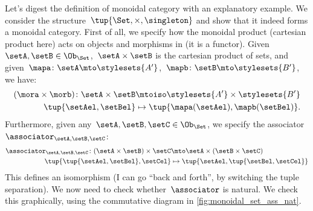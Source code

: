 
\begin{example}
    Let's digest the definition of monoidal category with an explanatory example.
    We consider the structure~$\tup{\Set,\times,\singleton}$ and show that it indeed forms a monoidal category.
    First of all, we specify how the monoidal product (cartesian product here) acts on objects and morphisms in \Set (it is a functor).
    Given~$\setA,\setB\in \Ob_{\Set}$,~$\setA\times \setB$ is the cartesian product of sets, and given~$\mapa\colon \setA\mto \stylesets{A'}$,~$\mapb\colon \setB\mto \stylesets{B'}$, we have:
    \begin{equation*}
        \label{eq:set_mon_prod_2}
        \begin{aligned}
        (\mora \times \morb)
            \colon \setA\times \setB&\mtoiso \stylesets{A'}\times \stylesets{B'}\\
            \tup{\setAel,\setBel}&\mapsto \tup{\mapa(\setAel),\mapb(\setBel)}.
        \end{aligned}
    \end{equation*}
    Furthermore, given any~$\setA,\setB,\setC\in \Ob_{\Set}$, we specify the associator~$\associator_{\setA,\setB,\setC}$:
    \begin{equation*}
        \label{eq:set_mon_prod_3}
        \begin{aligned}
            \associator_{\setA,\setB,\setC}\colon (\setA\times \setB)\times \setC&\mto \setA\times (\setB\times \setC)\\
            \tup{\tup{\setAel,\setBel},\setCel}&\mapsto \tup{\setAel,\tup{\setBel,\setCel}}
        \end{aligned}
    \end{equation*}
    This defines an isomorphism (I can go ``back and forth'', by switching the tuple separation).
    We now need to check whether~$\associator$ is natural.
    We check this graphically, using the commutative diagram in \cref{fig:monoidal_set_ass_nat}.


\end{example}
